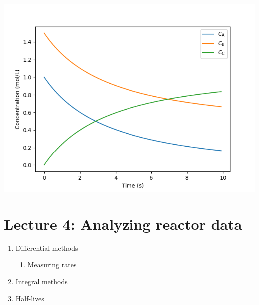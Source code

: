 \documentclass[11pt]{article}
\begin{document}
\begin{center}
\includegraphics[width=.9\linewidth]{./conc.png}
\end{center}

\section{Lecture 4: Analyzing reactor data}
\label{sec:org7bf98b9}
\begin{enumerate}
\item Differential methods
\begin{enumerate}
\item Measuring rates
\end{enumerate}
\item Integral methods
\item Half-lives
\end{enumerate}
\end{document}
